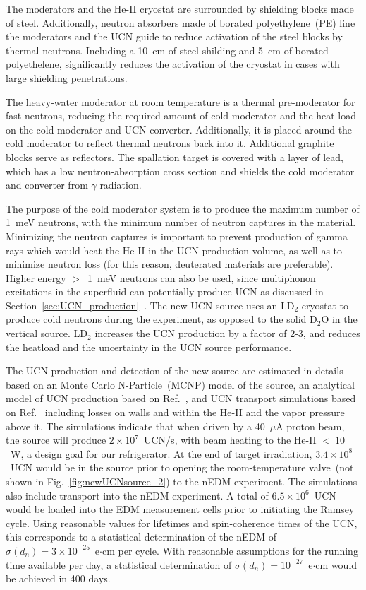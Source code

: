 The moderators and the He-II cryostat are surrounded by shielding blocks
made of steel. Additionally, neutron absorbers made of borated
polyethylene~(PE) line the moderators and the UCN guide to reduce
activation of the steel blocks by thermal neutrons. Including a 10~cm
of steel shilding and 5~cm of borated polyethelene, significantly
reduces the activation of the cryostat in cases with large shielding
penetrations.

The heavy-water moderator at room temperature is a thermal
pre-moderator for fast neutrons, reducing the required amount of cold
moderator and the heat load on the cold moderator and UCN
converter. Additionally, it is placed around the cold moderator to
reflect thermal neutrons back into it. Additional graphite blocks
serve as reflectors. The spallation target is covered with a layer of
lead, which has a low neutron-absorption cross section and shields the
cold moderator and converter from $\gamma$ radiation.

The purpose of the cold moderator system is to produce the maximum
number of 1~meV neutrons, with the minimum number of neutron captures
in the material. Minimizing the neutron captures is important to
prevent production of gamma rays which would heat the He-II in the UCN
production volume, as well as to minimize neutron loss (for this
reason, deuterated materials are preferable). Higher energy $>$~1~meV
neutrons can also be used, since multiphonon excitations in the
superfluid can potentially produce UCN as discussed in
Section~\ref{sec:UCN_production}~\cite{Schmidt2009,
  Korobkina2002}. The new UCN source uses an LD$_2$ cryostat to
produce cold neutrons during the experiment, as opposed to the solid
D$_2$O in the vertical source. LD$_2$ increases the UCN production by
a factor of 2-3, and reduces the heatload and the uncertainty in the
UCN source performance.



The UCN production and detection of the new source are estimated in
details based on an Monte Carlo N-Particle~(MCNP) model of the source,
an analytical model of UCN production based on
Ref.~\cite{Korobkina2002}, and UCN transport simulations based on
Ref.~\cite{schreyer2017pentrack} including losses on walls and within
the He-II and the vapor pressure above it.  The simulations indicate
that when driven by a 40~$\mu$A proton beam, the source will produce
$2\times 10^7$~UCN/s, with beam heating to the He-II $<~10$~W, a
design goal for our refrigerator. At the end of target irradiation,
$3.4\times 10^8$~UCN would be in the source prior to opening the
room-temperature valve~(not shown in Fig.~\ref{fig:newUCNsource_2}) to
the nEDM experiment.  The simulations also include transport into the
nEDM experiment. A total of $6.5 \times 10^6$~UCN would be loaded into
the EDM measurement cells prior to initiating the Ramsey cycle. Using
reasonable values for lifetimes and spin-coherence times of the UCN,
this corresponds to a statistical determination of the nEDM of
$\sigma(d_n) = 3\times 10^{-25}$~e$\cdot$cm per cycle. With reasonable
assumptions for the running time available per day, a statistical
determination of $\sigma(d_n) = 10^{-27}$~e$\cdot$cm would be achieved
in 400 days.

